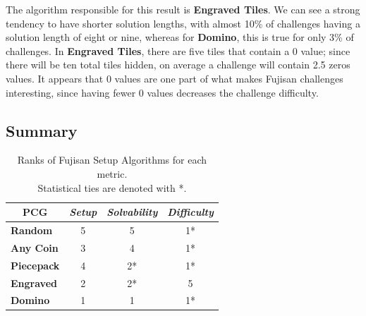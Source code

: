 \documentclass[10pt,journal,compsoc]{IEEEtran}
\begin{document}
The algorithm responsible for this result is {\bf Engraved Tiles}. We can see a strong tendency to have shorter solution lengths, with almost 10\% of challenges having a solution length of eight or nine, whereas for {\bf Domino}, this is true for only 3\% of challenges. In {\bf Engraved Tiles}, there are five tiles that contain a 0 value; since there will be ten total tiles hidden, on average a challenge will contain 2.5 zeros values. It appears that 0 values are one part of what makes Fujisan challenges interesting, since having fewer 0 values decreases the challenge difficulty.


\subsection{Summary}
\begin{table}[]
\centering
\renewcommand{\arraystretch}{1.3}
\caption{Ranks of Fujisan Setup Algorithms for each metric.\\ Statistical ties are denoted with *.}
\label{table_example}
\begin{tabular}{l|c|c|c|}
\multicolumn{1}{c|}{\textbf{PCG}} & \multicolumn{1}{l|}{\textit{\textbf{Setup}}} & \multicolumn{1}{l|}{\textit{\textbf{Solvability}}} & \multicolumn{1}{l|}{\textit{\textbf{Difficulty}}} \\ \hline
\textbf{Random}                   & 5                                            & 5                                                  & 1*                                                 \\ \hline
\textbf{Any Coin}                 & 3                                            & 4                                                  & 1*                                                 \\ \hline
\textbf{Piecepack}                & 4                                            & 2*                                                  & 1*                                                 \\ \hline
\textbf{Engraved}                 & 2                                            & 2*                                                  & 5                                                 \\ \hline
\textbf{Domino}                   & 1                                            & 1                                                  & 1*                                                 \\ \hline
\end{tabular}
\end{table}
\end{document}
